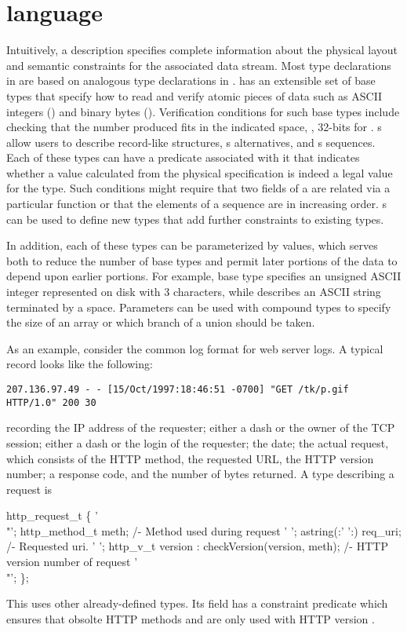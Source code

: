\documentclass[10pt]{article}
\begin{document}
\section{\pads{} language}
Intuitively, a \pads{} description specifies complete information
about the physical layout and semantic constraints for the associated
data stream.  Most type declarations in \padsl{} are based on analogous type declarations in \C{}.
\pads{} has an extensible set of base types that
specify how to read and verify atomic pieces of data such as ASCII
integers () and binary bytes ().
Verification conditions for such base types include checking that the
number produced fits in the indicated space, \ie, 32-bits for
.  \pads{}
s allow users to describe record-like structures, 
s alternatives, and s sequences.  Each of these
types can have a predicate associated with it that indicates whether a
value calculated from the physical specification is indeed a legal
value for the type.  Such conditions might require that two fields of a
 are related via a particular function or that the elements
of a sequence are in increasing order.  \pads{} s can be used
to define new types that add further constraints to existing types.

In addition, each of these types can be parameterized by values, which
serves both to reduce the number of base types and permit later
portions of the data to depend upon earlier portions.  For example,
base type  specifies an unsigned ASCII integer
represented on disk with 3 characters, while 
describes an ASCII string terminated by a space.  Parameters can be 
used with compound types to specify the size of an array or which
branch of a union should be taken.

As an example, consider the common log format for web server logs.  A
typical record looks like the following:
\begin{verbatim}
207.136.97.49 - - [15/Oct/1997:18:46:51 -0700] "GET /tk/p.gif HTTP/1.0" 200 30
\end{verbatim}
recording the IP address of the requester; either a dash or the owner
of the TCP session; either a dash or the login of the requester; the
date; the actual request, which consists of the HTTP method, the
requested URL, the HTTP version number; a response code, and the
number of bytes returned.  A \pads{} type describing a request is
\begin{code}
 http_request_t \{
  '\\"'; http_method_t  meth;            /- Method used during request
  ' ';  astring(:' ':) req_uri;         /- Requested uri.
  ' ';  http_v_t       version : checkVersion(version, meth);
                                        /- HTTP version number of request 
  '\\"';
\};
\end{code}
This  uses other already-defined types.
Its  field has a constraint predicate
which ensures that obsolte HTTP methods  and  
are only used with HTTP version .
\end{document}
